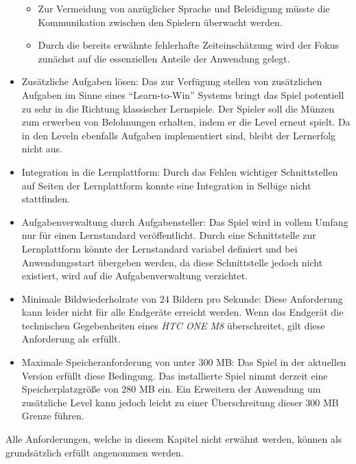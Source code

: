 \begin{itemize}
\begin{itemize}
        \item{Zur Vermeidung von anzüglicher Sprache und Beleidigung müsste die Kommunikation zwischen den Spielern überwacht werden.}
        \item{Durch die bereits erwähnte fehlerhafte Zeiteinschätzung wird der Fokus zunächst auf die essenziellen Anteile der Anwendung gelegt.}
    \end{itemize}
    \item{\label{zusätzlicheAufgaben}Zusätzliche Aufgaben lösen: Das zur Verfügung stellen von zusätzlichen Aufgaben im Sinne eines \enquote{Learn-to-Win} Systems bringt das Spiel potentiell zu sehr in die Richtung klassischer Lernspiele. Der Spieler soll die Münzen zum erwerben von Belohnungen erhalten, indem er die Level erneut spielt. Da in den Leveln ebenfalls Aufgaben implementiert sind, bleibt der Lernerfolg nicht aus.}
    \item{Integration in die Lernplattform: Durch das Fehlen wichtiger Schnittstellen auf Seiten der Lernplattform konnte eine Integration in Selbige nicht stattfinden.}
    \item{Aufgabenverwaltung durch Aufgabensteller: Das Spiel wird in vollem Umfang nur für einen Lernstandard veröffentlicht. Durch eine Schnittstelle zur Lernplattform könnte der Lernstandard variabel definiert und bei Anwendungsstart übergeben werden, da diese Schnittstelle jedoch nicht existiert, wird auf die Aufgabenverwaltung verzichtet.}
    \item{Minimale Bildwiederholrate von $24$ Bildern pro Sekunde: Diese Anforderung kann leider nicht für alle Endgeräte erreicht werden. Wenn das Endgerät die technischen Gegebenheiten eines \emph{HTC ONE M8} überschreitet, gilt diese Anforderung als erfüllt.}
    \item{Maximale Speicheranforderung von unter $300$ MB: Das Spiel in der aktuellen Version erfüllt diese Bedingung. Das installierte Spiel nimmt derzeit eine Speicherplatzgröße von $280$ MB ein. Ein Erweitern der Anwendung um zusätzliche Level kann jedoch leicht zu einer Überschreitung dieser $300$ MB Grenze führen.}
\end{itemize}
Alle Anforderungen, welche in diesem Kapitel nicht erwähnt werden, können als grundsätzlich erfüllt angenommen werden.

